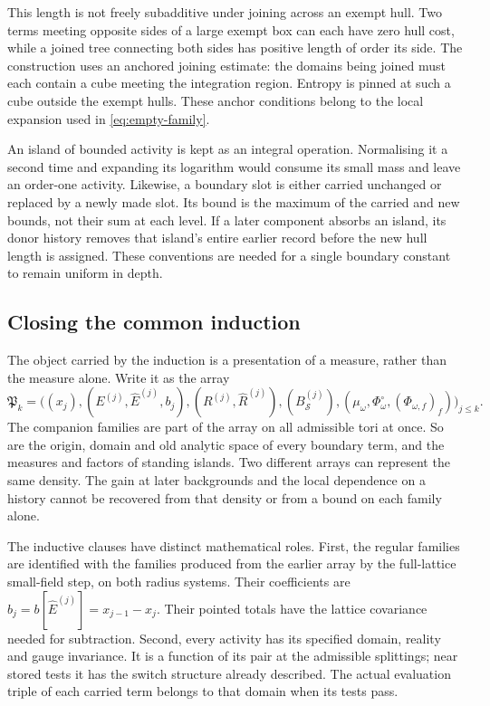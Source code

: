 \documentclass[11pt,letterpaper,reqno]{amsart}
\theoremstyle{definition}
\theoremstyle{remark}
\begin{document}
This length is not freely subadditive under
joining across an exempt hull. Two terms meeting
opposite sides of a large exempt box can each have
zero hull cost, while a joined tree connecting
both sides has positive length of order its side.
The construction uses an anchored joining estimate:
the domains being joined must each contain a cube
meeting the integration region. Entropy is pinned
at such a cube outside the exempt hulls. These
anchor conditions belong to the local expansion
used in \eqref{eq:empty-family}.

An island of bounded activity is kept as an
integral operation. Normalising it a second time
and expanding its logarithm would consume its
small mass and leave an order-one activity.
Likewise, a boundary slot is either carried
unchanged or replaced by a newly made slot.
Its bound is the maximum of the carried and new
bounds, not their sum at each level. If a later
component absorbs an island, its donor history
removes that island's entire earlier record
before the new hull length is assigned. These
conventions are needed for a single boundary
constant to remain uniform in depth.

\subsection{Closing the common induction}

The object carried by the induction is a
presentation of a measure, rather than
the measure alone. Write it as the
array
\begin{equation}\label{eq:xrg-inductive-array}
 \mathfrak P_k=
 \big((x_j),
       (E^{(j)},\widehat E^{(j)},b_j),
       (R^{(j)},\widehat R^{(j)}),
       (B^{(j)}_{\mathcal S}),
       (\mu_\omega,\Phi^\circ_\omega,
                                 (\Phi_{\omega,f})_f)\big)_{j\le k}.
\end{equation}
The companion families are part of the
array on all admissible tori at once.
So are the origin, domain and old
analytic space of every boundary
term, and the measures and factors
of standing islands. Two different
arrays can represent the same density.
The gain at later backgrounds and
the local dependence on a history
cannot be recovered from that density
or from a bound on each family alone.

The inductive clauses have distinct
mathematical roles. First, the regular
families are identified with the
families produced from the earlier
array by the full-lattice small-field
step, on both radius systems. Their
coefficients are
$b_j=b[\widehat E^{(j)}]=x_{j-1}-x_j$.
Their pointed totals have the lattice
covariance needed for subtraction.
Second, every activity has its
specified domain, reality and gauge
invariance. It is a function of its
pair at the admissible splittings;
near stored tests it has the switch
structure already described. The
actual evaluation triple of each
carried term belongs to that domain
when its tests pass.
\end{document}
